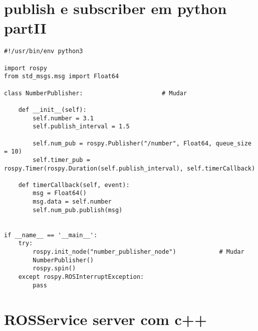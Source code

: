 \documentclass[letterpaper]{article}
\begin{document}
\section{publish e subscriber em python partII}
\begin{lstlisting}[style=pythonStyle, title=number\_publish.py]
#!/usr/bin/env python3

import rospy
from std_msgs.msg import Float64

class NumberPublisher:         	            # Mudar

    def __init__(self):
        self.number = 3.1
        self.publish_interval = 1.5

        self.num_pub = rospy.Publisher("/number", Float64, queue_size = 10)
        self.timer_pub = rospy.Timer(rospy.Duration(self.publish_interval), self.timerCallback)

    def timerCallback(self, event):
        msg = Float64()
        msg.data = self.number
        self.num_pub.publish(msg)
        

if __name__ == '__main__':
    try:
        rospy.init_node("number_publisher_node")	        # Mudar
        NumberPublisher()
        rospy.spin()
    except rospy.ROSInterruptException:
        pass

\end{lstlisting}

\section{ROSService server com  c++}
\end{document}
